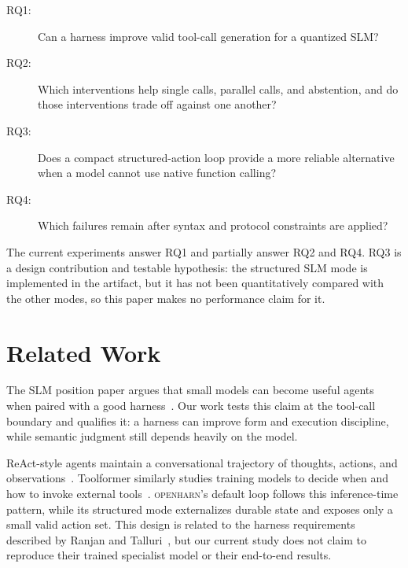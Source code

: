 \documentclass[conference]{IEEEtran}
\newcommand{\openharn}{\textsc{openharn}}
\begin{document}
\begin{description}
\item[RQ1:] Can a harness improve valid tool-call generation for a quantized SLM?
\item[RQ2:] Which interventions help single calls, parallel calls, and abstention, and do
those interventions trade off against one another?
\item[RQ3:] Does a compact structured-action loop provide a more reliable alternative when a
model cannot use native function calling?
\item[RQ4:] Which failures remain after syntax and protocol constraints are applied?
\end{description}

The current experiments answer RQ1 and partially answer RQ2 and RQ4. RQ3 is a design
contribution and testable hypothesis: the structured SLM mode is implemented in the artifact,
but it has not been quantitatively compared with the other modes, so this paper makes no
performance claim for it.

\section{Related Work}

The SLM position paper argues that small models can become useful agents when paired with a
good harness~\cite{belcak2025slm}. Our work tests this claim at the tool-call boundary and
qualifies it: a harness can improve form and execution discipline, while semantic judgment
still depends heavily on the model.

ReAct-style agents maintain a conversational trajectory of thoughts, actions, and
observations~\cite{yao2023react}. Toolformer similarly studies training models to decide when
and how to invoke external tools~\cite{schick2023toolformer}. \openharn's default loop follows
this inference-time pattern, while its structured mode externalizes durable state and exposes
only a small valid action set. This design is related to the harness requirements described by
Ranjan and Talluri~\cite{ranjan2026slm}, but our current study does not claim to reproduce their
trained specialist model or their end-to-end results.
\end{document}
